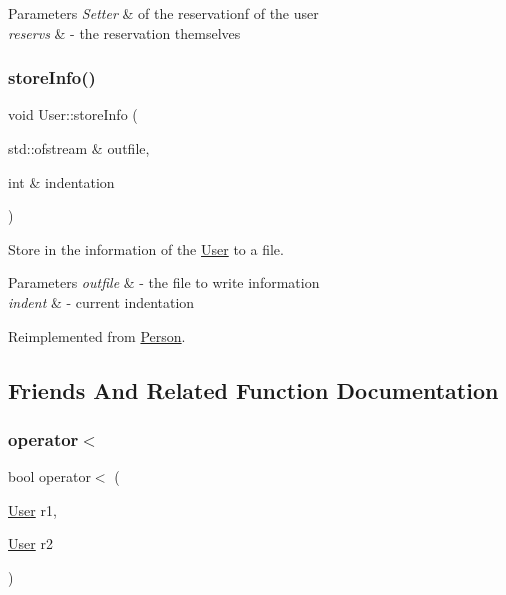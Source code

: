 \begin{DoxyParams}{Parameters}
{\em Setter} & of the reservationf of the user \\
\hline
{\em reservs} & -\/ the reservation themselves \\
\hline
\end{DoxyParams}
\mbox{\label{class_user_aac5ff0f6899f3ce56d1b2d12ed557c79}} 
\subsubsection{\texorpdfstring{store\+Info()}{storeInfo()}}
{\footnotesize\ttfamily void User\+::store\+Info (\begin{DoxyParamCaption}\item[{std\+::ofstream \&}]{outfile,  }\item[{int \&}]{indentation }\end{DoxyParamCaption})\hspace{0.3cm}{\ttfamily [virtual]}}



Store in the information of the \mbox{\hyperlink{class_user}{User}} to a file. 


\begin{DoxyParams}{Parameters}
{\em outfile} & -\/ the file to write information \\
\hline
{\em indent} & -\/ current indentation \\
\hline
\end{DoxyParams}


Reimplemented from \mbox{\hyperlink{class_person_a80f87df3f644706c2ad8fc8b800fdd95}{Person}}.



\subsection{Friends And Related Function Documentation}
\mbox{\label{class_user_a87114b6342ed4dc307aa3a185258b4c0}} 
\subsubsection{\texorpdfstring{operator$<$}{operator<}}
{\footnotesize\ttfamily bool operator$<$ (\begin{DoxyParamCaption}\item[{\mbox{\hyperlink{class_user}{User}}}]{r1,  }\item[{\mbox{\hyperlink{class_user}{User}}}]{r2 }\end{DoxyParamCaption})\hspace{0.3cm}{\ttfamily [friend]}}



